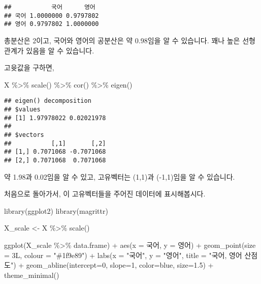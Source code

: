 \documentclass[
]{article}
\newenvironment{Shaded}{\begin{snugshade}}{\end{snugshade}}
\newcommand{\AttributeTok}[1]{\textcolor[rgb]{0.77,0.63,0.00}{#1}}
\newcommand{\DecValTok}[1]{\textcolor[rgb]{0.00,0.00,0.81}{#1}}
\newcommand{\FloatTok}[1]{\textcolor[rgb]{0.00,0.00,0.81}{#1}}
\newcommand{\FunctionTok}[1]{\textcolor[rgb]{0.00,0.00,0.00}{#1}}
\newcommand{\NormalTok}[1]{#1}
\newcommand{\OtherTok}[1]{\textcolor[rgb]{0.56,0.35,0.01}{#1}}
\newcommand{\SpecialCharTok}[1]{\textcolor[rgb]{0.00,0.00,0.00}{#1}}
\newcommand{\StringTok}[1]{\textcolor[rgb]{0.31,0.60,0.02}{#1}}
\begin{document}
\begin{verbatim}
##           국어      영어
## 국어 1.0000000 0.9797802
## 영어 0.9797802 1.0000000
\end{verbatim}

총분산은 2이고, 국어와 영어의 공분산은 약 0.98임을 알 수 있습니다. 꽤나
높은 선형관계가 있음을 알 수 있습니다.

고윳값을 구하면,

\begin{Shaded}
\begin{Highlighting}[]
\NormalTok{X }\SpecialCharTok{\%\textgreater{}\%} \FunctionTok{scale}\NormalTok{() }\SpecialCharTok{\%\textgreater{}\%} \FunctionTok{cor}\NormalTok{() }\SpecialCharTok{\%\textgreater{}\%} \FunctionTok{eigen}\NormalTok{()}
\end{Highlighting}
\end{Shaded}

\begin{verbatim}
## eigen() decomposition
## $values
## [1] 1.97978022 0.02021978
## 
## $vectors
##           [,1]       [,2]
## [1,] 0.7071068 -0.7071068
## [2,] 0.7071068  0.7071068
\end{verbatim}

약 1.98과 0.02임을 알 수 있고, 고유벡터는 (1,1)과 (-1,1)임을 알 수
있습니다.

처음으로 돌아가서, 이 고유벡터들을 주어진 데이터에 표시해봅시다.

\begin{Shaded}
\begin{Highlighting}[]
\FunctionTok{library}\NormalTok{(ggplot2)}
\FunctionTok{library}\NormalTok{(magrittr)}

\NormalTok{X\_scale }\OtherTok{\textless{}{-}}\NormalTok{ X }\SpecialCharTok{\%\textgreater{}\%} \FunctionTok{scale}\NormalTok{()}

 
\FunctionTok{ggplot}\NormalTok{(X\_scale }\SpecialCharTok{\%\textgreater{}\%}\NormalTok{ data.frame) }\SpecialCharTok{+}
 \FunctionTok{aes}\NormalTok{(}\AttributeTok{x =}\NormalTok{ 국어, }\AttributeTok{y =}\NormalTok{ 영어) }\SpecialCharTok{+}
 \FunctionTok{geom\_point}\NormalTok{(}\AttributeTok{size =}\NormalTok{ 3L, }\AttributeTok{colour =} \StringTok{"\#1f9e89"}\NormalTok{) }\SpecialCharTok{+}
 \FunctionTok{labs}\NormalTok{(}\AttributeTok{x =} \StringTok{"국어"}\NormalTok{, }\AttributeTok{y =} \StringTok{"영어"}\NormalTok{, }\AttributeTok{title =} \StringTok{"국어, 영어 산점도"}\NormalTok{) }\SpecialCharTok{+}
 \FunctionTok{geom\_abline}\NormalTok{(}\AttributeTok{intercept=}\DecValTok{0}\NormalTok{, }\AttributeTok{slope=}\DecValTok{1}\NormalTok{, }\AttributeTok{color=}\StringTok{\textquotesingle{}blue\textquotesingle{}}\NormalTok{, }\AttributeTok{size=}\FloatTok{1.5}\NormalTok{) }\SpecialCharTok{+}
 \FunctionTok{theme\_minimal}\NormalTok{()}
\end{Highlighting}
\end{Shaded}
\end{document}
